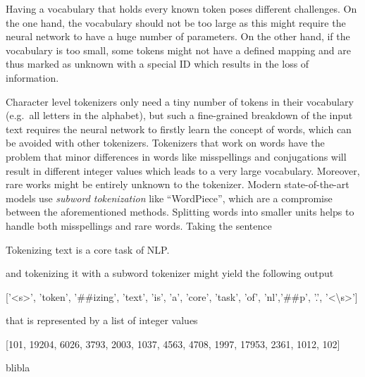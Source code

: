 Having a vocabulary that holds every known token poses different challenges.
On the one hand, the vocabulary should not be too large as this might require the neural network to have a huge number of parameters.
On the other hand, if the vocabulary is too small, some tokens might not have a defined mapping and are thus marked as unknown with a special ID which results in the loss of information.

Character level tokenizers only need a tiny number of tokens in their vocabulary (e.g.\ all letters in the alphabet), but such a fine-grained breakdown of the input text requires the neural network to firstly learn the concept of words, which can be avoided with other tokenizers.
Tokenizers that work on words have the problem that minor differences in words like misspellings and conjugations will result in different integer values which leads to a very large vocabulary.
Moreover, rare works might be entirely unknown to the tokenizer.
Modern state-of-the-art models use \textit{subword tokenization} like \enquote{WordPiece}, which are a compromise between the aforementioned methods.
Splitting words into smaller units helps to handle both misspellings and rare words.
Taking the sentence

\begin{center}
\colorbox{goodgreen!15}{
    \begin{minipage}{0.5\textwidth}
        Tokenizing text is a core task of NLP.
    \end{minipage}
}
\end{center}

and tokenizing it with a subword tokenizer might yield the following output
\begin{center}
\colorbox{goodgreen!15}{
    \centering
    \begin{minipage}{0.9\textwidth}
    ['<s>', 'token', '##izing', 'text', 'is', 'a', 'core', 'task', 'of', 'nl','##p', '.', '<\backslash s>']
    \end{minipage}
}
\end{center}
that is represented by a list of integer values
\begin{center}
    \colorbox{goodgreen!15}{
        \centering
        \begin{minipage}{0.9\textwidth}
        [101, 19204, 6026, 3793, 2003, 1037, 4563, 4708, 1997, 17953, 2361, 1012, 102]
        \end{minipage}
    }
\end{center}

blibla

